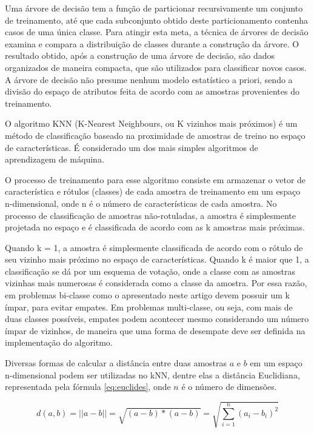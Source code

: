 Uma árvore de decisão tem a função de particionar recursivamente um conjunto de treinamento, até que cada subconjunto obtido deste particionamento contenha casos de uma única classe. Para atingir esta meta, a técnica de árvores de decisão examina e compara a distribuição de classes durante a construção da árvore. O resultado obtido, após a construção de uma árvore de decisão, são dados organizados de maneira compacta, que são utilizados para classificar novos casos. A árvore de decisão não presume nenhum modelo estatístico a priori, sendo a divisão do espaço de atributos feita de acordo com as amostras provenientes do treinamento.

O algoritmo KNN (K-Nearest Neighbours, ou K vizinhos mais próximos) \cite{cover:1967} é um método de classificação baseado na proximidade de amostras de treino no espaço de características. É considerado um dos mais simples algoritmos de aprendizagem de máquina.

O processo de treinamento para esse algoritmo consiste em armazenar o vetor de característica e rótulos (classes) de cada amostra de treinamento em um espaço n-dimensional, onde n é o número de características de cada amostra. No processo de classificação de amostras não-rotuladas, a amostra é simplesmente projetada no espaço e é classificada de acordo com as k amostras mais próximas.

Quando k = 1, a amostra é simplesmente classificada de acordo com o rótulo de seu vizinho mais próximo no espaço de características. Quando k é maior que 1, a classificação se dá por um esquema de votação, onde a classe com as amostras vizinhas mais numerosas é considerada como a classe da amostra. Por essa razão, em problemas bi-classe como o apresentado neste artigo devem possuir um k ímpar, para evitar empates. Em problemas multi-classe, ou seja, com mais de duas classes possíveis, empates podem acontecer mesmo considerando um número ímpar de vizinhos, de maneira que uma forma de desempate deve ser definida na implementação do algoritmo.

Diversas formas de calcular a distância entre duas amostras $a$ e $b$ em um espaço n-dimensional podem ser utilizadas no kNN, dentre elas a distância Euclidiana, representada pela fórmula \ref{eq:euclides}, onde $n$ é o número de dimensões.

\begin{equation}
	\displaystyle d(a,b) = ||a - b|| = \sqrt{(a - b)*(a -b)} =
	\displaystyle \sqrt{\sum_{i=1}^{n}(a_i - b_i)^2}
\label{eq:euclides}
\end{equation}

